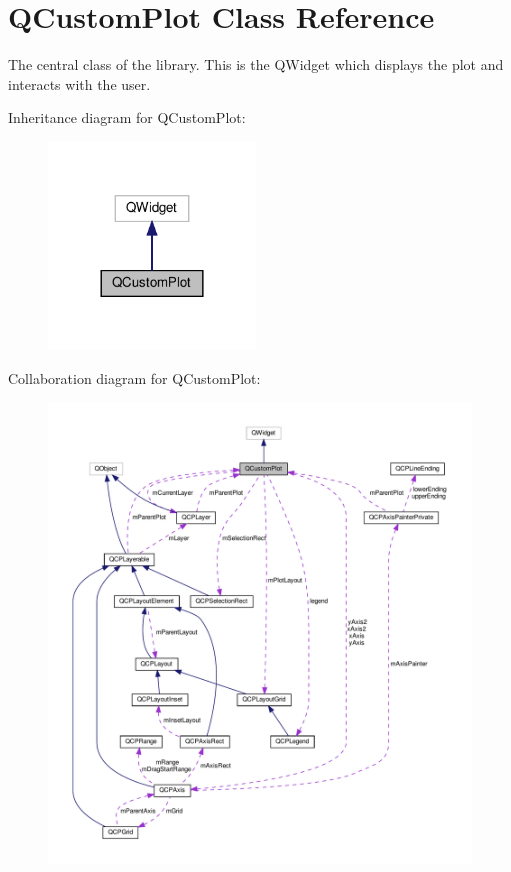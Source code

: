 \hypertarget{classQCustomPlot}{}\section{Q\+Custom\+Plot Class Reference}
\label{classQCustomPlot}


The central class of the library. This is the Q\+Widget which displays the plot and interacts with the user.  




Inheritance diagram for Q\+Custom\+Plot\+:\nopagebreak
\begin{figure}[H]
\begin{center}
\leavevmode
\includegraphics[width=156pt]{classQCustomPlot__inherit__graph}
\end{center}
\end{figure}


Collaboration diagram for Q\+Custom\+Plot\+:\nopagebreak
\begin{figure}[H]
\begin{center}
\leavevmode
\includegraphics[width=350pt]{classQCustomPlot__coll__graph}
\end{center}
\end{figure}
